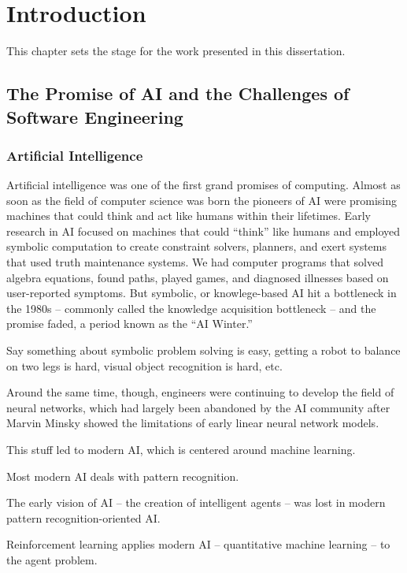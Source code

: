 \chapter{Introduction}

This chapter sets the stage for the work presented in this dissertation.

\section{The Promise of AI and the Challenges of Software Engineering}

\subsection{Artificial Intelligence}

Artificial intelligence was one of the first grand promises of computing. Almost as soon as the field of computer science was born the pioneers of AI were promising machines that could think and act like humans within their lifetimes. Early research in AI focused on machines that could ``think'' like humans and employed symbolic computation to create constraint solvers, planners, and exert systems that used truth maintenance systems. We had computer programs that solved algebra equations, found paths, played games, and diagnosed illnesses based on user-reported symptoms. But symbolic, or knowlege-based AI hit a bottleneck in the 1980s -- commonly called the knowledge acquisition bottleneck -- and the promise faded, a period known as the ``AI Winter.''

Say something about symbolic problem solving is easy, getting a robot to balance on two legs is hard, visual object recognition is hard, etc.

Around the same time, though, engineers were continuing to develop the field of neural networks, which had largely been abandoned by the AI community after Marvin Minsky showed the limitations of early linear neural network models.

This stuff led to modern AI, which is centered around machine learning.

Most modern AI deals with pattern recognition.

The early vision of AI -- the creation of intelligent agents -- was lost in modern pattern recognition-oriented AI.

Reinforcement learning applies modern AI -- quantitative machine learning -- to the agent problem.

